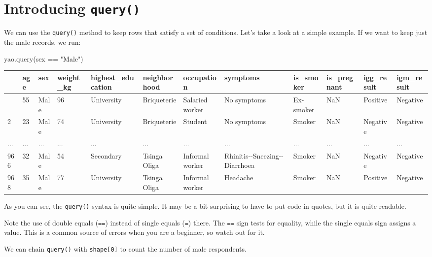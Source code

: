 \documentclass[
  letterpaper,
  DIV=11,
  numbers=noendperiod]{scrreprt}
\newenvironment{Shaded}{\begin{snugshade}}{\end{snugshade}}
\newcommand{\NormalTok}[1]{\textcolor[rgb]{0.00,0.23,0.31}{#1}}
\newcommand{\StringTok}[1]{\textcolor[rgb]{0.13,0.47,0.30}{#1}}
\begin{document}
\section{\texorpdfstring{Introducing
\texttt{query()}}{Introducing query()}}\label{introducing-query}

We can use the \texttt{query()} method to keep rows that satisfy a set
of conditions. Let's take a look at a simple example. If we want to keep
just the male records, we run:

\begin{Shaded}
\begin{Highlighting}[]
\NormalTok{yao.query(}\StringTok{\textquotesingle{}sex == "Male"\textquotesingle{}}\NormalTok{)}
\end{Highlighting}
\end{Shaded}

\begin{longtable}[]{@{}llllllllllll@{}}
\toprule\noalign{}
& age & sex & weight\_kg & highest\_education & neighborhood &
occupation & symptoms & is\_smoker & is\_pregnant & igg\_result &
igm\_result \\
\midrule\noalign{}
\endhead
\bottomrule\noalign{}
\endlastfoot
1 & 55 & Male & 96 & University & Briqueterie & Salaried worker & No
symptoms & Ex-smoker & NaN & Positive & Negative \\
2 & 23 & Male & 74 & University & Briqueterie & Student & No symptoms &
Smoker & NaN & Negative & Negative \\
... & ... & ... & ... & ... & ... & ... & ... & ... & ... & ... & ... \\
966 & 32 & Male & 54 & Secondary & Tsinga Oliga & Informal worker &
Rhinitis-\/-Sneezing-\/-Diarrhoea & Smoker & NaN & Negative &
Negative \\
968 & 35 & Male & 77 & University & Tsinga Oliga & Informal worker &
Headache & Smoker & NaN & Positive & Negative \\
\end{longtable}

As you can see, the \texttt{query()} syntax is quite simple. It may be a
bit surprising to have to put code in quotes, but it is quite readable.

Note the use of double equals (\texttt{==}) instead of single equals
(\texttt{=}) there. The \texttt{==} sign tests for equality, while the
single equals sign assigns a value. This is a common source of errors
when you are a beginner, so watch out for it.

We can chain \texttt{query()} with \texttt{shape{[}0{]}} to count the
number of male respondents.
\end{document}
